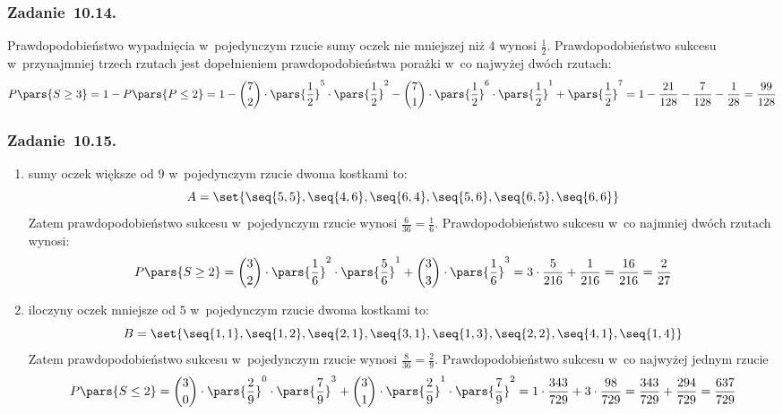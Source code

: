 \subsubsection*{Zadanie~10.14.}
Prawdopodobieństwo wypadnięcia w~pojedynczym rzucie sumy oczek nie mniejszej niż \(4\) wynosi \(\frac{1}{2}\). Prawdopodobieństwo sukcesu w~przynajmniej trzech rzutach jest dopełnieniem prawdopodobieństwa porażki w~co najwyżej dwóch rzutach:
\begin{equation*}
    P\pars{S \geq 3}
        = 1 - P\pars{P \leq 2}
        = 1 - \binom{7}{2} \cdot \pars{\frac{1}{2}}^5 \cdot \pars{\frac{1}{2}}^2 - \binom{7}{1} \cdot \pars{\frac{1}{2}}^6 \cdot \pars{\frac{1}{2}}^1 + \pars{\frac{1}{2}}^7
        = 1 - \frac{21}{128} - \frac{7}{128} - \frac{1}{28}
        = \frac{99}{128}
\end{equation*}
\subsubsection*{Zadanie~10.15.}
\begin{enumerate}[label={\alph*)}]
    \item sumy oczek większe od \(9\) w~pojedynczym rzucie dwoma kostkami to:
        \begin{equation*}
            A = \set{\seq{5, 5}, \seq{4, 6}, \seq{6, 4}, \seq{5, 6}, \seq{6, 5}, \seq{6, 6}}
        \end{equation*}
        Zatem prawdopodobieństwo sukcesu w~pojedynczym rzucie wynosi \(\frac{6}{36} = \frac{1}{6}\). Prawdopodobieństwo sukcesu w~co najmniej dwóch rzutach wynosi:
        \begin{equation*}
            P\pars{S \geq 2}
                = \binom{3}{2} \cdot \pars{\frac{1}{6}}^2 \cdot \pars{\frac{5}{6}}^1 + \binom{3}{3} \cdot \pars{\frac{1}{6}}^3
                = 3 \cdot \frac{5}{216}  + \frac{1}{216}
                = \frac{16}{216}
                = \frac{2}{27}
        \end{equation*}
    \item iloczyny oczek mniejsze od \(5\) w~pojedynczym rzucie dwoma kostkami to:
        \begin{equation*}
            B = \set{\seq{1, 1}, \seq{1, 2}, \seq{2, 1}, \seq{3, 1}, \seq{1, 3}, \seq{2, 2}, \seq{4, 1}, \seq{1, 4}}
        \end{equation*}
        Zatem prawdopodobieństwo sukcesu w~pojedynczym rzucie wynosi \(\frac{8}{36} = \frac{2}{9}\). Prawdopodobieństwo sukcesu w~co najwyżej jednym rzucie
        \begin{equation*}
            P\pars{S \leq 2} = \binom{3}{0} \cdot \pars{\frac{2}{9}}^0 \cdot \pars{\frac{7}{9}}^3 + \binom{3}{1} \cdot \pars{\frac{2}{9}}^1 \cdot \pars{\frac{7}{9}}^2 = 1 \cdot \frac{343}{729} + 3 \cdot \frac{98}{729} = \frac{343}{729} + \frac{294}{729} = \frac{637}{729}
        \end{equation*}
\end{enumerate}
